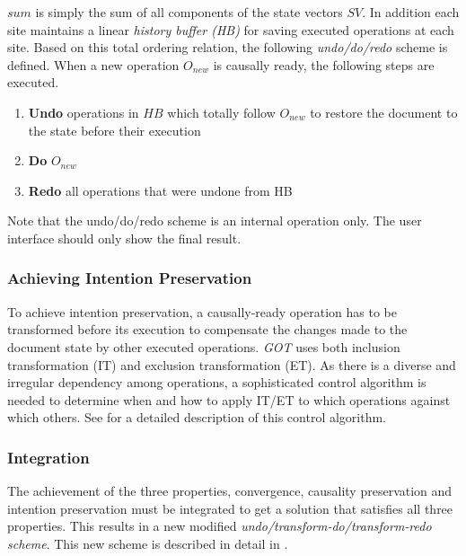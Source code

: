 $sum$ is simply the sum of all components of the state vectors $SV$. In addition each site maintains a linear \emph{history buffer (HB)} for saving executed operations at each site. Based on this total ordering relation, the following \emph{undo/do/redo} scheme is defined. When a new operation $O_{new}$ is causally ready, the following steps are executed.

\begin{enumerate}
 \item \textbf{Undo} operations in $HB$ which totally follow $O_{new}$ to 
       restore the document to the state before their execution
 \item \textbf{Do} $O_{new}$
 \item \textbf{Redo} all operations that were undone from HB
\end{enumerate}

Note that the undo/do/redo scheme is an internal operation only. The user interface should only show the final result.


\subsubsection{Achieving Intention Preservation}
To achieve intention preservation, a causally-ready operation has to be transformed before its execution to compensate the changes made to the document state by other executed operations. \emph{GOT} uses both inclusion transformation (IT) and exclusion transformation (ET). As there is a diverse and irregular dependency among operations, a sophisticated control algorithm is needed to determine when and how to apply IT/ET to which operations against which others. See \cite{sun98a} for a detailed description of this control algorithm.


\subsubsection{Integration}
The achievement of the three properties, convergence, causality preservation and intention preservation must be integrated to get a solution that satisfies all three properties. This results in a new modified \emph{undo/transform-do/transform-redo scheme}. This new scheme is described in detail in \cite{sun98b}.


